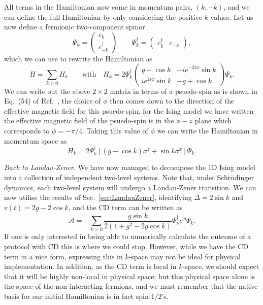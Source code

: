 All terms in the Hamiltonian now come in momentum pairs, $(k,-k)$, and we can define the full Hamiltonian by only considering the positive $k$ values. Let us now define a fermionic two-component spinor 
\begin{equation}
\Psi_k = \begin{pmatrix}
c_k \\ c_{-k}^\dagger
\end{pmatrix} \qquad \Psi_k^\dagger = \begin{pmatrix}
c_k^\dagger & c_{-k}
\end{pmatrix},
\end{equation}
which we can use to rewrite the Hamiltonian as
\begin{equation}
H = \sum_{k>0} H_k \qquad \mathrm{with} \quad H_k = 2 \Psi_k^\dagger \begin{pmatrix}
g - \cos k & - i e^{-2i\phi} \sin k \\
i e^{2i\phi} \sin k & - g + \cos k
\end{pmatrix} \Psi_k.
\end{equation}
We can write out the above $2\times2$ matrix in terms of a psuedo-spin as is shown in Eq.~(54) of Ref.~\cite{mbengArXiv2020}, the choice of $\phi$ then comes down to the direction of the effective magnetic field for this psuedo-spin, for the Ising model we have written the effective magnetic field of the psuedo-spin is in the $x\!-\!z$ plane which corresponds to $\phi=-\pi/4$. Taking this value of $\phi$ we can write the Hamiltonian in momentum space as
\begin{equation}
H_k = 2 \Psi_k^\dagger \left[ \left( g - \cos k \right) \sigma^z + \sin k \sigma^x \right] \Psi_k.
\end{equation}

\emph{Back to Landau-Zener}. We have now managed to decompose the 1D Ising model into a collection of independent two-level systems. Note that, under Schr\"odinger dynamics, each two-level system will undergo a Landau-Zener transition. We can now utilise the results of Sec.~\ref{sec:LandauZener}, identifying $\Delta = 2 \sin k$ and $v(t) = 2g - 2\cos k$, and the CD term can be written as
\begin{equation}
\mathcal{A} = - \sum_{k>0}  \frac{\dot{g}\sin k }{2\left( 1 + g^2 - 2g\cos k \right)} \Psi_k^\dagger \sigma^y \Psi_k.
\end{equation}
If one is only interested in being able to numerically calculate the outcome of a protocol with CD this is where we could stop. However, while we have the CD term in a nice form, expressing this in $k$-space may not be ideal for physical implementation. In addition, as the CD term is local in $k$-space, we should expect that it will be highly non-local in physical space; but this physical space alone is the space of the non-interacting fermions, and we must remember that the native basis for our initial Hamiltonian is in fact spin-$1/2$'s.

